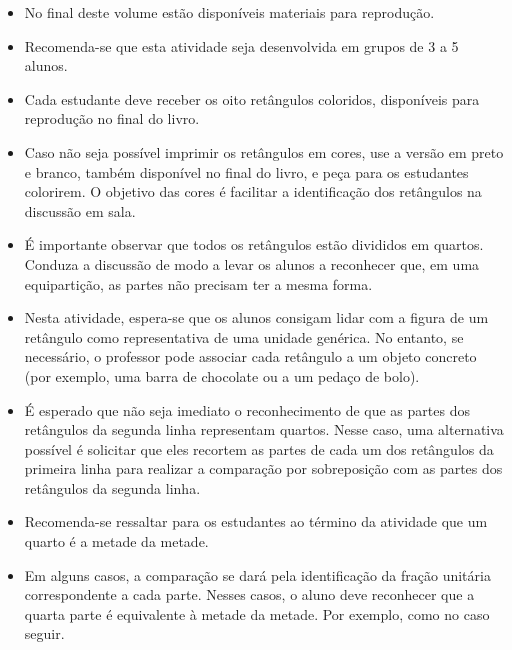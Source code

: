 \begin{multicols}{2}
  \begin{itemize} %
    \item No final deste volume estão disponíveis materiais para reprodução.
    \item Recomenda-se que esta atividade seja desenvolvida em grupos de 3 a 5 alunos.
    \item Cada estudante deve receber os oito retângulos coloridos, disponíveis para reprodução no final do livro.
    \item Caso não seja possível imprimir os retângulos em cores, use a versão em preto e branco, também disponível no final do livro, e peça para os estudantes colorirem. O objetivo das cores é facilitar a identificação dos retângulos na discussão em sala.
    \item É importante observar que todos os retângulos estão divididos em quartos. Conduza a discussão de modo a levar os alunos a reconhecer que, em uma equipartição, as partes não precisam ter a mesma forma.
    \item Nesta atividade, espera-se que os alunos consigam lidar com a figura de um retângulo como representativa de uma unidade genérica.  No entanto, se necessário, o professor pode associar cada retângulo a um objeto concreto (por exemplo, uma barra de chocolate ou a um pedaço de bolo).
    \item É esperado que não seja imediato o reconhecimento de que as partes dos retângulos da segunda linha representam quartos. Nesse caso,  uma alternativa possível é solicitar que eles recortem as partes de cada um dos retângulos da primeira linha para realizar a comparação por sobreposição com as partes dos retângulos da segunda linha.
   \item Recomenda-se ressaltar para os estudantes ao término da atividade que um quarto é a metade da metade.
    \item Em alguns casos, a comparação se dará pela identificação da fração unitária correspondente a cada parte. Nesses casos, o aluno deve reconhecer que a quarta parte é equivalente à metade da metade. Por exemplo, como no caso seguir.
 
\end{itemize} %


\end{multicols}
